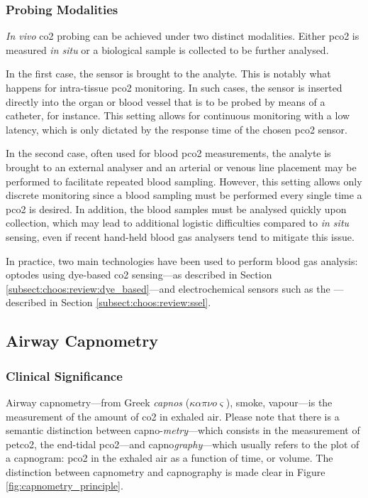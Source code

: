 \subsubsection{Probing Modalities}

\textit{In vivo} \gls{co2} probing can be achieved under two distinct modalities. Either \gls{pco2} is measured \textit{in situ} or a biological sample is collected to be further analysed.

In the first case, the sensor is brought to the analyte. This is notably what happens for intra-tissue \gls{pco2} monitoring. In such cases, the sensor is inserted directly into the organ or blood vessel that is to be probed by means of a catheter, for instance. This setting allows for continuous monitoring with a low latency, which is only dictated by the response time of the chosen \gls{pco2} sensor\cite{ganter2003}.

In the second case, often used for blood \gls{pco2} measurements, the analyte is brought to an external analyser and an arterial or venous line placement may be performed to facilitate repeated blood sampling. However, this setting allows only discrete monitoring since a blood sampling must be performed every single time a \gls{pco2} is desired. In addition, the blood samples must be analysed quickly upon collection, which may lead to additional logistic difficulties compared to \textit{in situ} sensing\cite{nanji1984}, even if recent hand-held blood gas analysers tend to mitigate this issue\cite{luukkonen2016}.

In practice, two main technologies have been used to perform blood gas analysis: optodes using dye-based \gls{co2} sensing---as described in Section \ref{subsect:choos:review:dye_based}\cite{ganter2003, menzel2003}---and electrochemical sensors such as the \ssel{}---described in Section \ref{subsect:choos:review:ssel}\cite{badnjevic2011}.

\subsection{Airway Capnometry}\label{subsect:airway_cap}

\subsubsection{Clinical Significance}\label{subsect:airway_capno_cc}

Airway capnometry---from Greek \textit{capnos} ($\kappa\alpha\pi\nu o \varsigma$), smoke, vapour---is the measurement of the amount of \gls{co2} in exhaled air. Please note that there is a semantic distinction between capno-\emph{metry}---which consists in the measurement of \gls{petco2}, the end-tidal \gls{pco2}---and capno\emph{graphy}---which usually refers to the plot of a capnogram: \gls{pco2} in the exhaled air as a function of time, or volume. The distinction between capnometry and capnography is made clear in Figure \ref{fig:capnometry_principle}.

